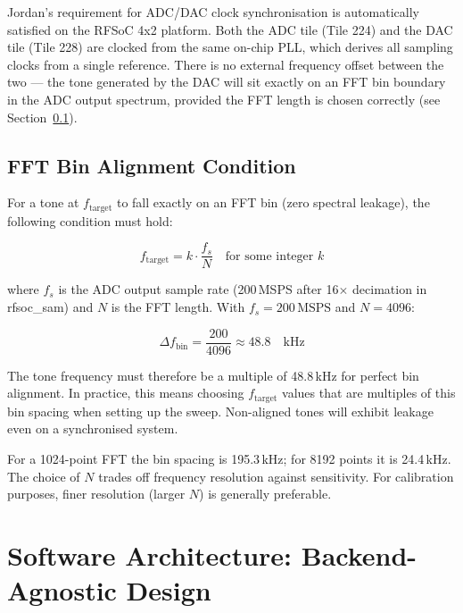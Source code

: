 \documentclass[11pt,a4paper]{article}
\newenvironment{notebox}{\begin{tcolorbox}[enhanced,colback=notebg,colframe=noteborder,
  left=5pt,right=5pt,top=3pt,bottom=3pt,
  before upper={\small\textbf{\color{noteborder}NOTE:\enspace}}]}{\end{tcolorbox}}
\begin{document}
Jordan's requirement for ADC/DAC clock synchronisation is automatically satisfied
on the RFSoC 4x2 platform. Both the ADC tile (Tile 224) and the DAC tile (Tile 228)
are clocked from the same on-chip PLL, which derives all sampling clocks from a
single reference. There is no external frequency offset between the two --- the tone
generated by the DAC will sit exactly on an FFT bin boundary in the ADC output
spectrum, provided the FFT length is chosen correctly (see Section~\ref{sec:fft}).

\subsection{FFT Bin Alignment Condition}
\label{sec:fft}

For a tone at $f_{\text{target}}$ to fall exactly on an FFT bin (zero spectral
leakage), the following condition must hold:

\begin{equation}
  f_{\text{target}} = k \cdot \frac{f_s}{N}
  \quad \text{for some integer } k
\end{equation}

where $f_s$ is the ADC output sample rate (200\,MSPS after 16$\times$ decimation in
rfsoc\_sam) and $N$ is the FFT length. With $f_s = 200\,\text{MSPS}$ and
$N = 4096$:

\begin{equation}
  \Delta f_{\text{bin}} = \frac{200}{4096} \approx 48.8 \quad \text{kHz}
\end{equation}

The tone frequency must therefore be a multiple of 48.8\,kHz for perfect bin
alignment. In practice, this means choosing $f_{\text{target}}$ values that are
multiples of this bin spacing when setting up the sweep. Non-aligned tones will
exhibit leakage even on a synchronised system.

\begin{notebox}
For a 1024-point FFT the bin spacing is 195.3\,kHz; for 8192 points it is 24.4\,kHz.
The choice of $N$ trades off frequency resolution against sensitivity. For calibration
purposes, finer resolution (larger $N$) is generally preferable.
\end{notebox}

\section{Software Architecture: Backend-Agnostic Design}
\end{document}
